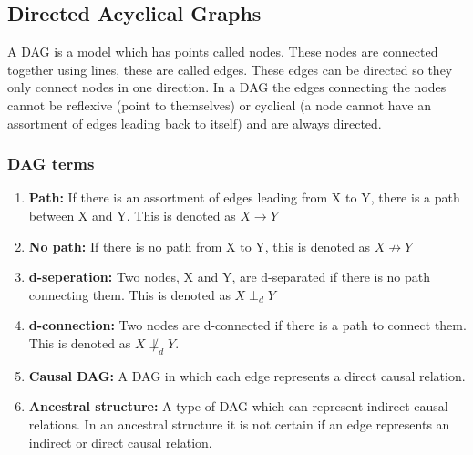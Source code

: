 \documentclass[11pt]{article}
\begin{document}
\subsection{Directed Acyclical Graphs}
A DAG is a model which has points called nodes. These nodes are connected together using lines, these are called edges. These edges can be directed so they only connect nodes in one direction. In a DAG the edges connecting the nodes cannot be reflexive (point to themselves) or cyclical (a node cannot have an assortment of edges leading back to itself) and are always directed.

\subsubsection{DAG terms}
\begin{enumerate}
    \item \textbf{Path:} If there is an assortment of edges leading from X to Y, there is a path between X and Y. This is denoted as $X \to Y$\\
    
    \item \textbf{No path:} If there is no path from X to Y, this is denoted as $X \not \to Y$\\
    
    \item \textbf{d-seperation:} Two nodes, X and Y, are d-separated if there is no path connecting them. This is denoted as $X \perp_d Y$
    
    \item \textbf{d-connection:} Two nodes are d-connected if there is a path to connect them. This is denoted as $X \not\perp_d Y$.
    
    \item \textbf{Causal DAG:} A DAG in which each edge represents a direct causal relation.
    
    \item \textbf{Ancestral structure:} A type of DAG which can represent indirect causal relations. In an ancestral structure it is not certain if an edge represents an indirect or direct causal relation. 
    
\end{enumerate}
\end{document}
